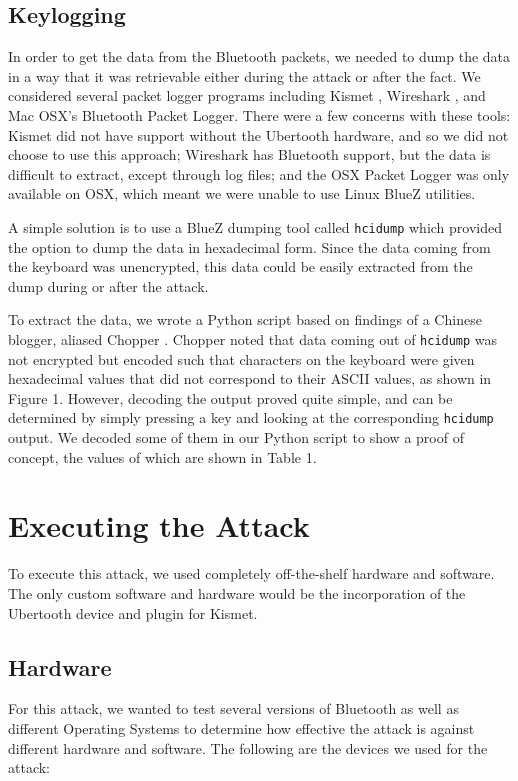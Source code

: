 \documentclass{acm_proc_article-sp}
\begin{document}
\subsection{Keylogging}
In order to get the data from the Bluetooth packets, we needed to dump the data in a way that it was retrievable either during the attack or after the fact. We considered several packet logger programs including Kismet \cite{kismet}, Wireshark \cite{wireshark}, and Mac OSX's Bluetooth Packet Logger. There were a few concerns with these tools: Kismet did not have support without the Ubertooth hardware, and so we did not choose to use this approach; Wireshark has Bluetooth support, but the data is difficult to extract, except through log files; and the OSX Packet Logger was only available on OSX, which meant we were unable to use Linux BlueZ utilities. 

A simple solution is to use a BlueZ dumping tool called \texttt{hcidump} which provided the option to dump the data in hexadecimal form. Since the data coming from the keyboard was unencrypted, this data could be easily extracted from the dump during or after the attack. 

To extract the data, we wrote a Python script based on findings of a Chinese blogger, aliased Chopper \cite{chopper}. Chopper noted that data coming out of \texttt{hcidump} was not encrypted but encoded such that characters on the keyboard were given hexadecimal values that did not correspond to their ASCII values, as shown in Figure 1. However, decoding the output proved quite simple, and can be determined by simply pressing a key and looking at the corresponding \texttt{hcidump} output. We decoded some of them in our Python script to show a proof of concept, the values of which are shown in Table 1.

\section{Executing the Attack}
To execute this attack, we used completely off-the-shelf hardware and software. The only custom software and hardware would be the incorporation of the Ubertooth device and plugin for Kismet. 

\subsection{Hardware}
For this attack, we wanted to test several versions of Bluetooth as well as different Operating Systems to determine how effective the attack is against different hardware and software. The following are the devices we used for the attack:
\end{document}
